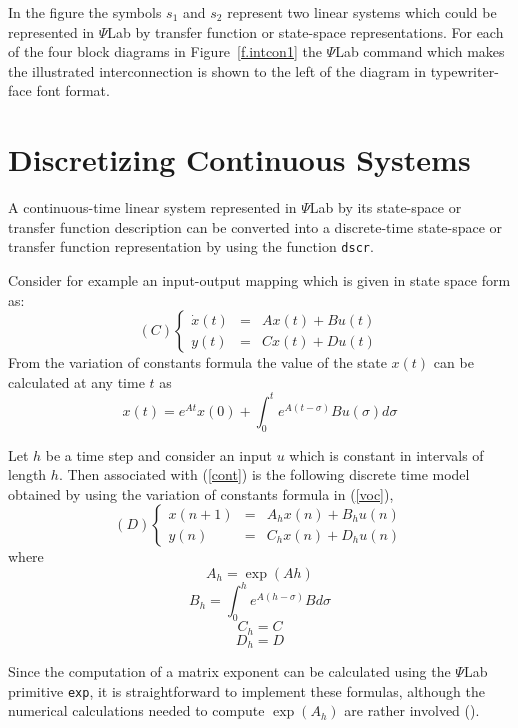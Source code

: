 %
In the figure the symbols $s_1$ and $s_2$ represent two linear systems
which could be represented in $\Psi$Lab by transfer function or state-space
representations.  For each of the four block diagrams 
in Figure~\ref{f.intcon1}
the $\Psi$Lab command which makes the illustrated interconnection is shown 
to the left of the diagram
in typewriter-face font format.

\section{Discretizing Continuous Systems}

	A continuous-time linear system represented in $\Psi$Lab by its
state-space or transfer function description can be converted into 
a discrete-time state-space or transfer function
representation by using the function {\tt dscr}. 

Consider for example an input-output mapping which is
given in state space form as:
%
\begin{equation}
   (C) \left\{ \begin{array}{ccc}
   \dot{x}(t) & = & A x(t) + B u(t) \\
   y(t) & = & C x(t) + D u(t)
   \end{array} \right. 
\label{cont}
\end{equation}
%
From the variation of constants formula the value of the
state $x(t)$ can be calculated at any time $t$ as
%
\begin{equation}
   x(t)=e^{At}x(0)+\int_{0}^{t}e^{A(t-\sigma)}Bu(\sigma)d\sigma
\label{voc}
\end{equation}
%

Let $h$ be a time step and consider an input $u$ 
which is constant in intervals of length $h$.
Then associated with (\ref{cont}) is the following discrete 
time model obtained by using the variation of constants formula in 
(\ref{voc}),
%
\begin{equation}
   (D) \left\{ \begin{array}{ccc}
   x(n+1) & = & A_{h} x(n) + B_{h} u(n)\nonumber \\
   y(n) & = & C_{h} x(n) + D_{h} u(n)
   \end{array} \right. 
\label{disc}
\end{equation}
%
where
$$A_{h}=\exp(Ah)$$
$$B_{h}=\int_{0}^{h}{e^{A(h-\sigma)}Bd\sigma}$$
$$C_{h}=C$$
$$D_{h}=D$$

Since the computation of a matrix exponent can be calculated using
the $\Psi$Lab primitive {\tt exp}, it is straightforward to implement 
these formulas, although the numerical calculations needed
to compute $\exp(A_h)$ are 
rather involved (\cite{VanLoan}). 

